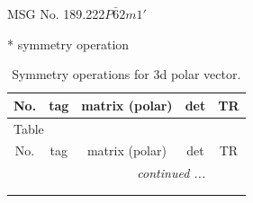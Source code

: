 \documentclass[fleqn,8pt]{jsarticle}
\begin{document}
\setcounter{MaxMatrixCols}{32}

\renewcommand{\tablename}{Table~}
\renewcommand{\figurename}{Figure~}
\begin{center}
\LARGE
MSG No. 189.222\quad$P\bar{6}2m1'$
\end{center}
* symmetry operation
\renewcommand{\arraystretch}{1.3}
\begin{longtable}{ccccc}
\caption{Symmetry operations for 3d polar vector.}
 \\
 \hline \hline
No. & tag & matrix (polar) & det & TR \\ \hline \endfirsthead

\multicolumn{4}{l}{\tablename\ \thetable{}} \\
 \hline \hline
No. & tag & matrix (polar) & det & TR \\ \hline \endhead

 \hline \hline
\multicolumn{4}{r}{\footnotesize\it continued ...} \\ \endfoot

 \hline \hline
\multicolumn{4}{r}{} \\ \endlastfoot


\end{longtable}
\end{document}
